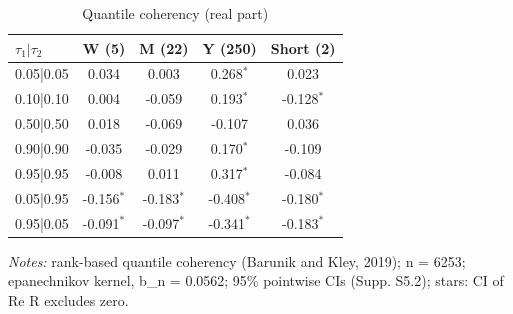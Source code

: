 \begin{table}[htbp]\centering
\caption{Quantile coherency (real part)}\label{tab:coh}
\begin{tabular}{lcccc}
\toprule
$\tau_1|\tau_2$ & W (5) & M (22) & Y (250) & Short (2) \\
\midrule
0.05|0.05 & 0.034 & 0.003 & 0.268$^{*}$ & 0.023 \\
0.10|0.10 & 0.004 & -0.059 & 0.193$^{*}$ & -0.128$^{*}$ \\
0.50|0.50 & 0.018 & -0.069 & -0.107 & 0.036 \\
0.90|0.90 & -0.035 & -0.029 & 0.170$^{*}$ & -0.109 \\
0.95|0.95 & -0.008 & 0.011 & 0.317$^{*}$ & -0.084 \\
0.05|0.95 & -0.156$^{*}$ & -0.183$^{*}$ & -0.408$^{*}$ & -0.180$^{*}$ \\
0.95|0.05 & -0.091$^{*}$ & -0.097$^{*}$ & -0.341$^{*}$ & -0.183$^{*}$ \\
\bottomrule
\end{tabular}
\par\smallskip\begin{minipage}{0.95\linewidth}\footnotesize\textit{Notes:} rank-based quantile coherency (Barunik and Kley, 2019); n = 6253; epanechnikov kernel, b\_n = 0.0562; 95\% pointwise CIs (Supp. S5.2); stars: CI of Re R excludes zero.\end{minipage}
\end{table}